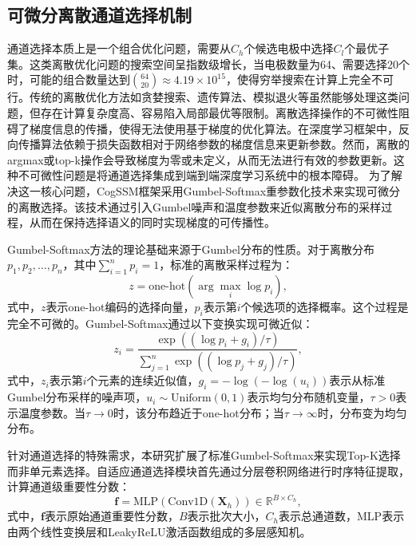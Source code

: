\subsection{可微分离散通道选择机制}
通道选择本质上是一个组合优化问题，需要从$C_h$个候选电极中选择$C_l$个最优子集。这类离散优化问题的搜索空间呈指数级增长，当电极数量为64、需要选择20个时，可能的组合数量达到$\binom{64}{20} \approx 4.19 \times 10^{15}$，使得穷举搜索在计算上完全不可行。传统的离散优化方法如贪婪搜索、遗传算法、模拟退火等虽然能够处理这类问题，但存在计算复杂度高、容易陷入局部最优等限制。离散选择操作的不可微性阻碍了梯度信息的传播，使得无法使用基于梯度的优化算法。在深度学习框架中，反向传播算法依赖于损失函数相对于网络参数的梯度信息来更新参数。然而，离散的argmax或top-k操作会导致梯度为零或未定义，从而无法进行有效的参数更新。这种不可微性问题是将通道选择集成到端到端深度学习系统中的根本障碍。
为了解决这一核心问题，CogSSM框架采用Gumbel-Softmax重参数化技术来实现可微分的离散选择\cite{strypsteen2021end}。该技术通过引入Gumbel噪声和温度参数来近似离散分布的采样过程，从而在保持选择语义的同时实现梯度的可传播性。


Gumbel-Softmax方法的理论基础来源于Gumbel分布的性质。对于离散分布${p_1, p_2, \ldots, p_n}$，其中$\sum_{i=1}^n p_i = 1$，标准的离散采样过程为：
\begin{equation}
z = \text{one-hot}(\arg\max_i \log p_i),
\end{equation}
式中，$z$表示one-hot编码的选择向量，$p_i$表示第$i$个候选项的选择概率。这个过程是完全不可微的。Gumbel-Softmax通过以下变换实现可微近似：
\begin{equation}
z_i = \frac{\exp((\log p_i + g_i)/\tau)}{\sum_{j=1}^n \exp((\log p_j + g_j)/\tau)},
\end{equation}
式中，$z_i$表示第$i$个元素的连续近似值，$g_i = -\log(-\log(u_i))$表示从标准Gumbel分布采样的噪声项，$u_i \sim \text{Uniform}(0,1)$表示均匀分布随机变量，$\tau > 0$表示温度参数。当$\tau \rightarrow 0$时，该分布趋近于one-hot分布；当$\tau \rightarrow \infty$时，分布变为均匀分布。

针对通道选择的特殊需求，本研究扩展了标准Gumbel-Softmax来实现Top-K选择而非单元素选择。自适应通道选择模块首先通过分层卷积网络进行时序特征提取，计算通道级重要性分数：
\begin{equation}
\mathbf{f} = \text{MLP}(\text{Conv1D}(\mathbf{X}_h)) \in \mathbb{R}^{B \times C_h},
\end{equation}
式中，$\mathbf{f}$表示原始通道重要性分数，$B$表示批次大小，$C_h$表示总通道数，MLP表示由两个线性变换层和LeakyReLU激活函数组成的多层感知机。


